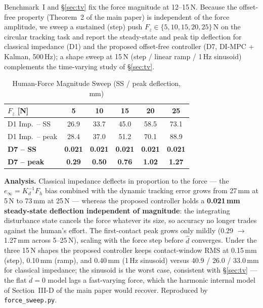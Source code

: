 \documentclass[journal]{IEEEtran}
\newcommand{\dhat}{\hat{d}}
\begin{document}
Benchmark~I and \S\ref{sec:tv} fix the force magnitude at 12--15\,N.
Because the offset-free property (Theorem~2 of the main paper) is
independent of the force amplitude, we sweep a sustained (step) push
$F_z\in\{5,10,15,20,25\}$\,N on the circular tracking task and report the
steady-state and peak tip deflection for classical impedance (D1) and
the proposed offset-free controller (D7, DI-MPC + Kalman, 500\,Hz); a
shape sweep at 15\,N (step / linear ramp / 1\,Hz sinusoid) complements
the time-varying study of \S\ref{sec:tv}.

\begin{table}[!t]
\caption{Human-Force Magnitude Sweep (SS / peak deflection, mm)}
\label{tab:fsweep}
\renewcommand{\arraystretch}{1.0}
\footnotesize
\setlength{\tabcolsep}{3pt}
\begin{tabular}{lccccc}
\toprule
$F_z$ [N] & 5 & 10 & 15 & 20 & 25\\
\midrule
D1 Imp.\ -- SS   & 26.9 & 33.7 & 45.0 & 58.5 & 73.1\\
D1 Imp.\ -- peak & 28.4 & 37.0 & 51.2 & 70.1 & 88.9\\
\textbf{D7 -- SS}   & \textbf{0.021} & \textbf{0.021} & \textbf{0.021} & \textbf{0.021} & \textbf{0.021}\\
\textbf{D7 -- peak} & \textbf{0.29} & \textbf{0.50} & \textbf{0.76} & \textbf{1.02} & \textbf{1.27}\\
\bottomrule
\end{tabular}
\end{table}

\textbf{Analysis.} Classical impedance deflects in proportion to the
force --- the $e_\infty=K_d^{-1}F_h$ bias combined with the dynamic
tracking error grows from 27\,mm at 5\,N to 73\,mm at 25\,N --- whereas
the proposed controller holds a \textbf{0.021\,mm steady-state
deflection independent of magnitude}: the integrating disturbance state
cancels the force whatever its size, so accuracy no longer trades
against the human's effort. The first-contact peak grows only mildly
(0.29 $\to$ 1.27\,mm across 5--25\,N), scaling with the force step
before $\dhat$ converges. Under the three 15\,N shapes the proposed
controller keeps contact-window RMS at 0.15\,mm (step), 0.10\,mm (ramp),
and 0.40\,mm (1\,Hz sinusoid) versus 40.9 / 26.0 / 33.0\,mm for classical
impedance; the sinusoid is the worst case, consistent with
\S\ref{sec:tv} --- the flat $\dot d=0$ model lags a fast-varying force,
which the harmonic internal model of Section~III-D of the main paper
would recover. Reproduced by \texttt{force\_sweep.py}.
\end{document}
